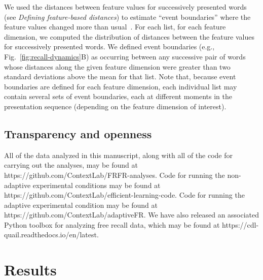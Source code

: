 \documentclass[11pt]{article}
\begin{document}
We used the distances between feature values for successively presented words
(see \textit{Defining feature-based distances}) to estimate ``event
boundaries'' where the feature values changed more than
usual~\citep{EzzyDava11, MannEtal16,RadvCope06, SwalEtal09, SwalEtal11,
DuBrDava16}. For each list, for each feature dimension, we computed the
distribution of distances between the feature values for successively presented
words. We defined event boundaries (e.g., Fig.~\ref{fig:recall-dynamics}B) as
occurring between any successive pair of words whose distances along the given
feature dimension were greater than two standard deviations above the mean for
that list. Note that, because event boundaries are defined for each feature
dimension, each individual list may contain several sets of event boundaries,
each at different moments in the presentation sequence (depending on the
feature dimension of interest).

\subsection*{Transparency and openness}

All of the data analyzed in this manuscript, along with all of the code for
carrying out the analyses, may be found at
https://github.com/ContextLab/FRFR-analyses. Code for running the non-adaptive
experimental conditions may be found at
https://github.com/Con\-text\-Lab/efficient-learning-code. Code for running the
adaptive experimental condition may be found at
https://github.com/ContextLab/adaptiveFR. We have also released an associated
Python toolbox for analyzing free recall data, which may be found at
https://cdl-quail.read\-the\-docs.io/\-en/\-latest.

\section*{Results}
\end{document}
